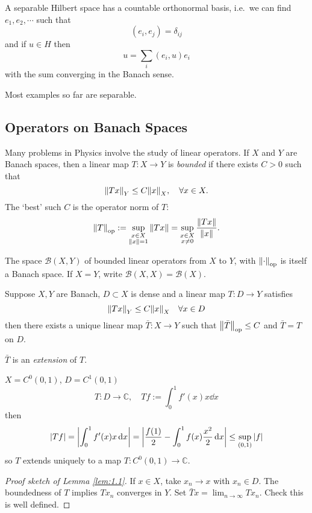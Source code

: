 \documentclass[a4paper,11pt]{article}
\begin{document}
	A separable Hilbert space has a countable orthonormal basis, i.e.\ we can find $e_1,e_2, \cdots$ such that 
	\[
		(e_i , e_j) = \delta _{ij}
	\]
	and if $u \in H$ then 
	\[
		u = \sum_i (e_i , u) e_i
	\]
	with the sum converging in the Banach sense.

	Most examples so far are separable.
	
	\subsection{Operators on Banach Spaces}

	Many problems in Physics involve the study of linear operators. If $X$ and $Y$ are Banach spaces, then a linear map $T : X \to Y$ is \emph{bounded} if there exists $C > 0$ such that 
	\[
		\norm{T x}_Y \leq C \norm{x}_X, \quad \forall x \in X.
	\]
	The `best' such $C$ is the operator norm of $T$: 
	\[
		\norm{T}_{\text{op}} : = \sup _{\substack{x \in X\\\norm{x}=1}} \norm{T x}= \sup _{\substack{x \in X\\x\neq 0}} \frac{\norm{T x }}{\norm{x}}.
	\]

	The space $\mathcal{B}(X,Y)$ of bounded linear operators from $X$ to $Y$, with $\norm{\cdot}_{\text{op}}$ is itself a Banach space. If $X = Y$, write $\mathcal{B}(X,X) = \mathcal{B}(X)$.

	\begin{lem}
		\label{lem:1.1}
		Suppose $X,Y$ are Banach, $D \subset X$ is dense and a linear map $T : D \to Y$ satisfies
		\[
			\norm{T x}_Y \leq C \norm{x}_X \quad \forall x \in D
		\]
		then there exists a unique linear map $\bar T : X \to Y$ such that $\norm{\bar T}_{\text{op}} \leq C$
		and $\bar T = T$ on $D$. 

		$\bar T$ is an \emph{extension} of $T$.
	\end{lem}

	\begin{ex}
		$X = C^0 (0,1)$, $D = C^1(0,1)$ 
		\[
			T: D \to \mathbb{C}, \quad Tf := \int_{0}^{1} f'(x)x \dd{x}
		\]
		then 
		\[
			\abs{Tf} = \abs{\int_{0}^{1} f'(x) x \dd{x}} = \abs{\frac{f(1)}{2} - \int_{0}^{1} f(x) \frac{x^2}{2} \dd{x}} \leq \sup _{(0,1)} \abs{f}
		\]
		so $T$ extends uniquely to a map $T : C^0(0,1) \to \mathbb{C}$.
	\end{ex}

	\begin{proof}[Proof sketch of Lemma \ref{lem:1.1}]
		If $x \in X$, take $x_n \to x$ with $x_n \in D$. The boundedness of $T$ implies $T x_n$ converges in $Y$. Set $\bar T x = \lim _{n \to \infty} T x_n$. Check this is well defined.  
	\end{proof}
	
\end{document}
